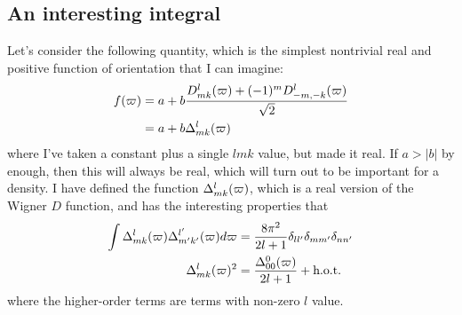 \documentclass[letterpaper,twocolumn,amsmath,amssymb,pre]{revtex4-1}
\begin{document}
\begin{widetext}
\subsection{An interesting integral}

Let's consider the following quantity, which is the simplest
nontrivial real and positive function of orientation that I can
imagine:
\begin{align}
  f(\mathbf{\varpi}) &= a + b\frac{D^{l}_{mk}(\mathbf{\varpi}) +
    (-1)^{m}D^{l}_{-m,-k}(\mathbf{\varpi})}{\sqrt 2}
  \\
  &= a + b \Delta^{l}_{mk}(\mathbf{\varpi})
\end{align}
where I've taken a constant plus a single $lmk$ value, but made it
real.  If $a > |b|$ by enough, then this will always be real, which
will turn out to be important for a density.  I have defined the
function $\Delta^{l}_{mk}(\mathbf{\varpi})$, which is a real version of the
Wigner $D$ function, and has the interesting properties that
\begin{align}
  \int \Delta^{l}_{mk}(\mathbf{\varpi}) \Delta^{l'}_{m'k'}(\mathbf{\varpi})d\mathbf{\varpi}
  &= \frac{8\pi^2}{2l+1}\delta_{ll'}\delta_{mm'}\delta_{nn'}
  \\
  \Delta^{l}_{mk}(\mathbf{\varpi})^2 &= \frac{\Delta^{0}_{00}(\mathbf{\varpi})}{2l+1} + \text{h.o.t.}
\end{align}
where the higher-order terms are terms with non-zero $l$ value.


\end{widetext}
\end{document}
